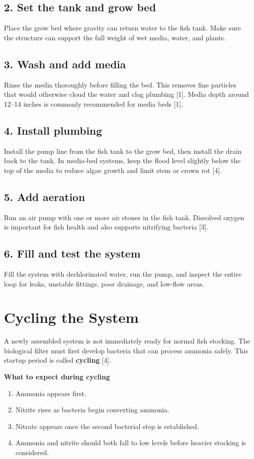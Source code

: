 \documentclass[11pt]{article}
\begin{document}
\subsection*{2. Set the tank and grow bed}
Place the grow bed where gravity can return water to the fish tank. Make sure the structure can support the full weight of wet media, water, and plants.

\subsection*{3. Wash and add media}
Rinse the media thoroughly before filling the bed. This removes fine particles that would otherwise cloud the water and clog plumbing [1]. Media depth around 12--14 inches is commonly recommended for media beds [1].

\subsection*{4. Install plumbing}
Install the pump line from the fish tank to the grow bed, then install the drain back to the tank. In media-bed systems, keep the flood level slightly below the top of the media to reduce algae growth and limit stem or crown rot [4].

\subsection*{5. Add aeration}
Run an air pump with one or more air stones in the fish tank. Dissolved oxygen is important for fish health and also supports nitrifying bacteria [3].

\subsection*{6. Fill and test the system}
Fill the system with dechlorinated water, run the pump, and inspect the entire loop for leaks, unstable fittings, poor drainage, and low-flow areas.

\section*{Cycling the System}
A newly assembled system is not immediately ready for normal fish stocking. The biological filter must first develop bacteria that can process ammonia safely. This startup period is called \textbf{cycling} [4].

\textbf{What to expect during cycling}
\begin{enumerate}
  \item Ammonia appears first.
  \item Nitrite rises as bacteria begin converting ammonia.
  \item Nitrate appears once the second bacterial step is established.
  \item Ammonia and nitrite should both fall to low levels before heavier stocking is considered.
\end{enumerate}
\end{document}
